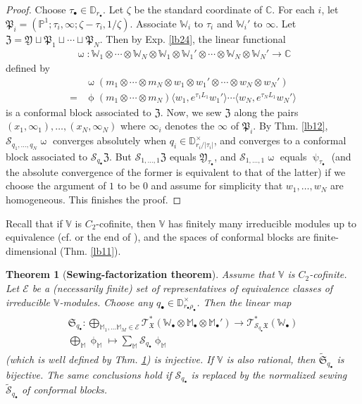 \documentclass[11pt,b5paper,notitlepage]{article}
\theoremstyle{definition}
\theoremstyle{plain}
\newtheorem{thm}[df]{Theorem}
\newcommand{\fk}{\mathfrak}
\newcommand{\mc}{\mathcal}
\newcommand{\wtd}{\widetilde}
\newcommand{\bk}[1]{\langle {#1}\rangle}
\newcommand{\scr}{\mathscr}
\newcommand{\blt}{\bullet}
\newcommand{\Vbb}{\mathbb V}
\newcommand{\Wbb}{\mathbb W}
\newcommand{\Mbb}{\mathbb M}
\newcommand{\Cbb}{\mathbb C}
\newcommand{\Pbb}{\mathbb P}
\newcommand{\Dbb}{\mathbb D}
\newcommand{\Std}{\widetilde{\mc S}}
\numberwithin{equation}{section}
\begin{document}
\begin{proof}
Choose $\tau_\blt\in\Dbb_{r_\blt}$. Let $\zeta$ be the standard coordinate of $\Cbb$. For each $i$, let $\fk P_i=(\Pbb^1;\tau_i,\infty;\zeta-\tau_i,1/\zeta)$. Associate $\Wbb_i$ to $\tau_i$ and $\Wbb_i'$ to $\infty$. Let $\fk Z=\fk Y\sqcup\fk P_1\sqcup\cdots\sqcup\fk P_N$. Then by Exp. \ref{lb24}, the linear functional
\begin{gather*}
\upomega:\Wbb_1\otimes\cdots\otimes\Wbb_N\otimes\Wbb_1\otimes\Wbb_1'\otimes\cdots\otimes\Wbb_N\otimes\Wbb_N'\rightarrow\Cbb
\end{gather*}
defined by
\begin{align*}
&\upomega(m_1\otimes\cdots\otimes m_N\otimes w_1\otimes w_1'\otimes\cdots\otimes w_N\otimes w_N')\\
=& \upphi(m_1\otimes\cdots\otimes m_N)\bk{w_1,e^{\tau_1L_1}w_1'}\cdots\bk{w_N,e^{\tau_NL_1}w_N'}
\end{align*}
is a conformal block associated to $\fk Z$. Now, we sew $\fk Z$ along the pairs $(x_1,\infty_1),\dots,(x_N,\infty_N)$ where $\infty_i$ denotes the $\infty$ of $\fk P_i$. By Thm. \ref{lb12}, $\mc S_{q_1,\dots,q_N}\upomega$ converges absolutely when $q_i\in\Dbb_{r_i/|\tau_i|}^\times$, and converges to a conformal block associated to $\mc S_{q_\blt}\fk Z$. But $\mc S_{1,\dots,1}\fk Z$ equals $\fk Y_{\tau_\blt}$, and $\mc S_{1,\dots,1}\upomega$ equals $\uppsi_{\tau_\blt}$ (and the absolute convergence of the former is equivalent to that of the latter) if we choose the argument of $1$ to be $0$ and assume for simplicity that $w_1,\dots,w_N$ are homogeneous. This finishes the proof. 
\end{proof}







Recall that if $\Vbb$ is $C_2$-cofinite, then $\Vbb$ has finitely many irreducible modules up to equivalence (cf. \cite{Zhu96,DLM00} or the end of \cite[Sec. 12]{Gui23a}), and the spaces of conformal blocks are finite-dimensional (Thm. \ref{lb11}).

\begin{thm}[\textbf{Sewing-factorization theorem}]\label{lb13}
Assume that $\Vbb$ is $C_2$-cofinite. Let $\mc E$ be a (necessarily finite) set of representatives of equivalence classes of irreducible $\Vbb$-modules. Choose any $q_\blt\in\Dbb_{r_\blt\rho_\blt}^\times$. Then the linear map
\begin{gather}
\begin{gathered}
\fk S_{q_\blt}:\bigoplus_{\Mbb_1,\dots\Mbb_M\in\mc E}\scr T_{\fk X}^*(\Wbb_\blt\otimes\Mbb_\blt\otimes\Mbb_\blt')\rightarrow\scr T_{\mc S_{q_\blt}\fk X}^*(\Wbb_\blt)\\
\bigoplus_\Mbb  \upphi_\Mbb\mapsto\sum_\Mbb \mc S_{q_\blt}\upphi_\Mbb
\end{gathered}
\end{gather}
(which is well defined by Thm. \ref{lb13}) is injective. If $\Vbb$ is also rational, then $\wtd{\fk S}_{q_\blt}$ is bijective. The same conclusions hold if $\mc S_{q_\blt}$ is replaced by the normalized sewing $\Std_{q_\blt}$ of conformal blocks.
\end{thm}
\end{document}
